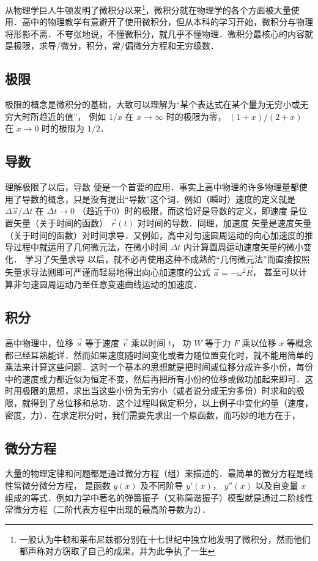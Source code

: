 从物理学巨人牛顿发明了微积分以来\footnote{一般认为牛顿和莱布尼兹都分别在十七世纪中独立地发明了微积分，然而他们都声称对方窃取了自己的成果，并为此争执了一生}，微积分就在物理学的各个方面被大量使用．高中的物理教学有意避开了使用微积分，但从本科的学习开始，微积分与物理将形影不离．不夸张地说，不懂微积分，就几乎不懂物理．微积分最核心的内容就是极限，求导/微分，积分，常/偏微分方程和无穷级数．

\subsection{极限}
极限的概念是微积分的基础，大致可以理解为“某个表达式在某个量为无穷小或无穷大时所趋近的值”， 例如 $1/x$ 在 $x\to\infty$ 时的极限为零， $(1+x)/(2+x)$ 在 $x\to 0$ 时的极限为 $1/2$． 

\subsection{导数}
理解极限了以后，导数 便是一个首要的应用．事实上高中物理的许多物理量都使用了导数的概念，只是没有提出“导数”这个词．例如（瞬时）速度的定义就是 $\Delta\vec s/\Delta t$ 在 $\Delta t \to 0$ （趋近于0）时的极限，而这恰好是导数的定义，即速度%
是位置矢量（关于时间的函数） $\vec r(t)$ 对时间的导数．同理，加速度%
矢量是速度矢量（关于时间的函数）对时间求导．又例如，高中对匀速圆周运动的向心加速度的推导过程中就运用了几何微元法，在微小时间 $\Delta t$ 内计算圆周运动速度矢量的微小变化． 学习了矢量求导 以后，就不必再使用这种不成熟的“几何微元法”而直接按照矢量求导法则即可严谨而轻易地得出向心加速度的公式 $\vec a = -\omega^2 \vec R$， 甚至可以计算非匀速圆周运动乃至任意变速曲线运动的加速度．

\subsection{积分}
高中物理中，位移 $\vec s$ 等于速度 $\vec v$ 乘以时间 $t$， 功 $W$ 等于力 $F$ 乘以位移 $x$ 等概念都已经耳熟能详．然而如果速度随时间变化或者力随位置变化时，就不能用简单的乘法来计算这些问题．这时一个基本的思想就是把时间或位移分成许多小份，每份中的速度或力都近似为恒定不变，然后再把所有小份的位移或做功加起来即可．这时用极限的思想，求出当这些小份为无穷小（或者说分成无穷多份）时求和的极限，就得到了总位移和总功．这个过程叫做定积分，以上例子中变化的量（速度，密度，力）．在求定积分时，我们需要先求出一个原函数，而巧妙的地方在于，

\subsection{微分方程}
大量的物理定律和问题都是通过微分方程（组）来描述的．最简单的微分方程是线性常微分微分方程，%
是函数 $y(x)$ 及不同阶导 $y'(x)$，  $y''(x)$ 以及自变量 $x$ 组成的等式．例如力学中著名的弹簧振子（又称简谐振子）模型就是通过二阶线性常微分方程（二阶代表方程中出现的最高阶导数为2）．

